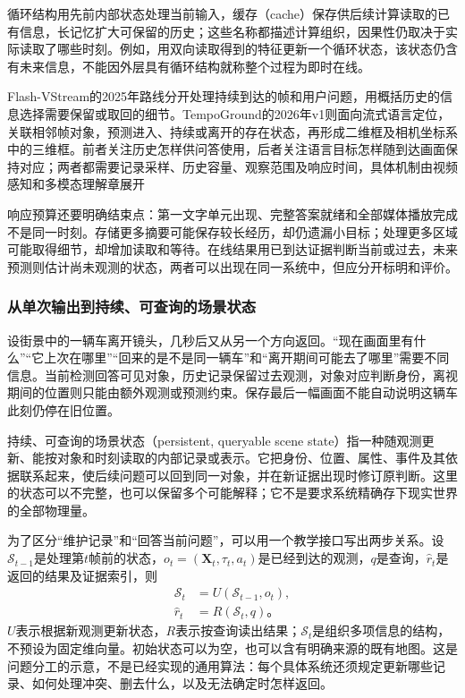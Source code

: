 循环结构用先前内部状态处理当前输入，缓存（cache）保存供后续计算读取的已有信息，长记忆扩大可保留的历史；这些名称都描述计算组织，因果性仍取决于实际读取了哪些时刻。例如，用双向读取得到的特征更新一个循环状态，该状态仍含有未来信息，不能因外层具有循环结构就称整个过程为即时在线。

Flash-VStream的2025年路线分开处理持续到达的帧和用户问题，用概括历史的信息选择需要保留或取回的细节。TempoGround的2026年v1则面向流式语言定位，关联相邻帧对象，预测进入、持续或离开的存在状态，再形成二维框及相机坐标系中的三维框。前者关注历史怎样供问答使用，后者关注语言目标怎样随到达画面保持对应；两者都需要记录采样、历史容量、观察范围及响应时间，具体机制由视频感知和多模态理解章展开

响应预算还要明确结束点：第一文字单元出现、完整答案就绪和全部媒体播放完成不是同一时刻。存储更多摘要可能保存较长经历，却仍遗漏小目标；处理更多区域可能取得细节，却增加读取和等待。在线结果用已到达证据判断当前或过去，未来预测则估计尚未观测的状态，两者可以出现在同一系统中，但应分开标明和评价。

\subsubsection{从单次输出到持续、可查询的场景状态}
\label{sec:vision-overview-queryable-state-frontier}

设街景中的一辆车离开镜头，几秒后又从另一个方向返回。“现在画面里有什么”“它上次在哪里”“回来的是不是同一辆车”和“离开期间可能去了哪里”需要不同信息。当前检测回答可见对象，历史记录保留过去观测，对象对应判断身份，离视期间的位置则只能由额外观测或预测约束。保存最后一幅画面不能自动说明这辆车此刻仍停在旧位置。

持续、可查询的场景状态（persistent, queryable scene state）指一种随观测更新、能按对象和时刻读取的内部记录或表示。它把身份、位置、属性、事件及其依据联系起来，使后续问题可以回到同一对象，并在新证据出现时修订原判断。这里的状态可以不完整，也可以保留多个可能解释；它不是要求系统精确存下现实世界的全部物理量。

为了区分“维护记录”和“回答当前问题”，可以用一个教学接口写出两步关系。设$\mathcal{S}_{t-1}$是处理第$t$帧前的状态，$o_t=(\bm{X}_t,\tau_t,a_t)$是已经到达的观测，$q$是查询，$\hat r_t$是返回的结果及证据索引，则
\begin{equation}
  \begin{aligned}
    \mathcal{S}_t&=U(\mathcal{S}_{t-1},o_t),\\
    \hat r_t&=R(\mathcal{S}_t,q)\text{。}
  \end{aligned}
  \label{eq:vision-overview-state-update-query}
\end{equation}
$U$表示根据新观测更新状态，$R$表示按查询读出结果；$\mathcal{S}_t$是组织多项信息的结构，不预设为固定维向量。初始状态可以为空，也可以含有明确来源的既有地图。这是问题分工的示意，不是已经实现的通用算法：每个具体系统还须规定更新哪些记录、如何处理冲突、删去什么，以及无法确定时怎样返回。

